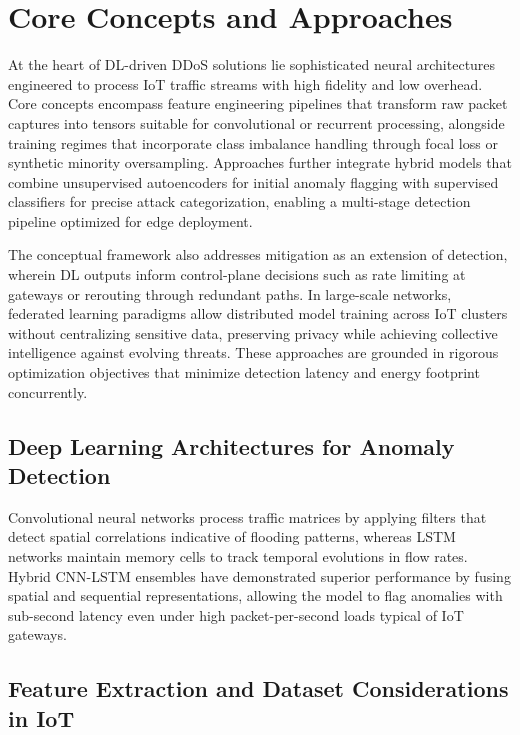 \documentclass[12pt]{article}
\begin{document}
\section{Core Concepts and Approaches}

At the heart of DL-driven DDoS solutions lie sophisticated neural architectures engineered to process IoT traffic streams with high fidelity and low overhead. Core concepts encompass feature engineering pipelines that transform raw packet captures into tensors suitable for convolutional or recurrent processing, alongside training regimes that incorporate class imbalance handling through focal loss or synthetic minority oversampling. Approaches further integrate hybrid models that combine unsupervised autoencoders for initial anomaly flagging with supervised classifiers for precise attack categorization, enabling a multi-stage detection pipeline optimized for edge deployment.

The conceptual framework also addresses mitigation as an extension of detection, wherein DL outputs inform control-plane decisions such as rate limiting at gateways or rerouting through redundant paths. In large-scale networks, federated learning paradigms allow distributed model training across IoT clusters without centralizing sensitive data, preserving privacy while achieving collective intelligence against evolving threats. These approaches are grounded in rigorous optimization objectives that minimize detection latency and energy footprint concurrently.

\subsection{Deep Learning Architectures for Anomaly Detection}

Convolutional neural networks process traffic matrices by applying filters that detect spatial correlations indicative of flooding patterns, whereas LSTM networks maintain memory cells to track temporal evolutions in flow rates. Hybrid CNN-LSTM ensembles have demonstrated superior performance by fusing spatial and sequential representations, allowing the model to flag anomalies with sub-second latency even under high packet-per-second loads typical of IoT gateways.

\subsection{Feature Extraction and Dataset Considerations in IoT}
\end{document}

